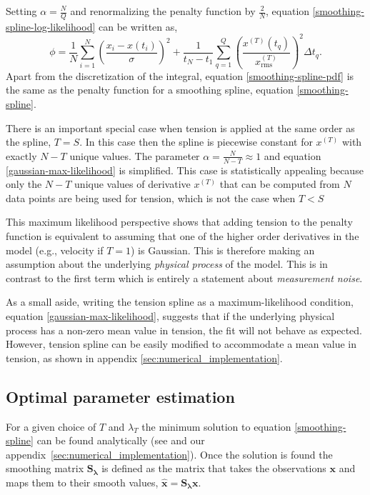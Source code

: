 \documentclass[10pt,journal]{IEEEtran}
\begin{document}
Setting $\alpha=\frac{N}{Q}$ and renormalizing the penalty function by $\frac{2}{N}$, equation \ref{smoothing-spline-log-likelihood} can be written as,
\begin{equation}
\label{smoothing-spline-pdf}
\phi = \frac{1}{N} \sum^N _{i=1}  \left( \frac{x_i - x(t_i)}{\sigma} \right)^2 + \frac{1}{t_N-t_1} \sum^{Q}_{q=1}  \left(  \frac{x^{(T)}(t_q)}{x^{(T)}_{\textrm{rms}}} \right)^2 \Delta t_q.
\end{equation}
Apart from the discretization of the integral, equation \ref{smoothing-spline-pdf} is the same as the penalty function for a smoothing spline, equation \ref{smoothing-spline}.

There is an important special case when tension is applied at the same order as the spline, $T=S$. In this case then the spline is piecewise constant for $x^{(T)}$ with exactly $N-T$ unique values. The parameter $\alpha =\frac{N}{N-T}\approx 1$ and equation \ref{gaussian-max-likelihood} is simplified. This case is statistically appealing because only the $N-T$ unique values of derivative $x^{(T)}$ that can be computed from $N$ data points are being used for tension, which is not the case when $T<S$

This maximum likelihood perspective shows that adding tension to the penalty function is equivalent to assuming that one of the higher order derivatives in the model (e.g., velocity if $T=1$) is Gaussian. This is therefore making an assumption about the underlying \emph{physical process} of the model. This is in contrast to the first term which is entirely a statement about \emph{measurement noise}.

As a small aside, writing the tension spline as a maximum-likelihood condition, equation \ref{gaussian-max-likelihood}, suggests that if the underlying physical process has a non-zero mean value in tension, the fit will not behave as expected. However, tension spline can be easily modified to accommodate a mean value in tension, as shown in appendix \ref{sec:numerical_implementation}. 

\subsection{Optimal parameter estimation} \label{sec:optimal_parameter}

For a given choice of $T$ and $\lambda_T$ the minimum solution to equation \ref{smoothing-spline} can be found analytically (see \cite{teanby2007-mg} and our appendix~\ref{sec:numerical_implementation}). Once the solution is found the smoothing matrix $\mathbf{S_\lambda}$ is defined as the matrix that takes the observations $\mathbf{x}$ and maps them to their smooth values, $\mathbf{\hat{x}} = \mathbf{S_\lambda} \mathbf{x}$.
\end{document}
